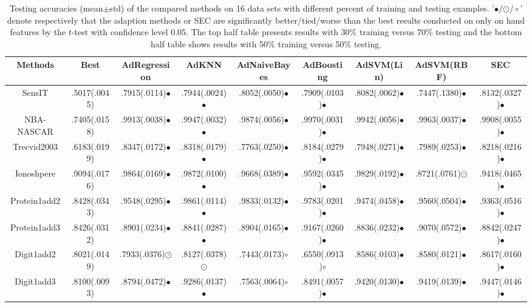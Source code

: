 \documentclass[10pt,journal,compsoc]{IEEEtran}
\begin{document}
\begin{table*}[!t]
\caption{Testing accuracies (mean$\pm$std) of the compared methods on 16 data sets with different percent of training and testing examples. '$\bullet/${\tiny $\odot$}$/\circ$' denote respectively that the adaption methods or SEC are significantly better/tied/worse than the best results conducted on only on hand features by the $t$-test\cite{t-test} with confidence level 0.05. The top half table presents results with 30\% training versus 70\% testing and the bottom half table shows results with 50\% training versus 50\% testing.}
\label{table_accuracy}
\centering
\vskip -0.1in
{
\begin{tabular}{c|| c c c c c c c c }
\hline
  Methods       &  Best   &  AdRegression   & AdKNN    & AdNaiveBayes    & AdBoosting &  AdSVM(Lin) & AdSVM(RBF) & SEC \\
\hline
SensIT          & .5017(.0045)& .7915(.0114)$\bullet$ & .7944(.0024)$\bullet$ & .8052(.0050)$\bullet$ & .7909(.0103)$\bullet$ & .8082(.0062)$\bullet$ & .7447(.1380)$\bullet$ & .8132(.0327)$\bullet$ \\
NBA-NASCAR      & .7405(.0158)& .9913(.0038)$\bullet$ & .9947(.0032)$\bullet$ & .9874(.0056)$\bullet$ & .9970(.0031)$\bullet$ & .9942(.0056)$\bullet$ & .9963(.0037)$\bullet$ & .9908(.0055)$\bullet$ \\
Trecvid2003     & .6183(.0199)& .8347(.0172)$\bullet$ & .8318(.0179)$\bullet$ & .7763(.0250)$\bullet$ & .8184(.0279)$\bullet$ & .7948(.0271)$\bullet$ & .7989(.0253)$\bullet$ & .8218(.0216)$\bullet$ \\
Ionoshpere      & .9094(.0176)& .9864(.0169)$\bullet$ & .9872(.0100)$\bullet$ & .9668(.0389)$\bullet$ & .9592(.0345)$\bullet$ & .9829(.0192)$\bullet$ & .8721(.0761){\tiny $\odot$} & .9418(.0465)$\bullet$ \\
Protein1add2    & .8428(.0343)& .9548(.0295)$\bullet$ & .9861(.0114)$\bullet$ & .9833(.0132)$\bullet$ & .9783(.0201)$\bullet$ & .9474(.0458)$\bullet$ & .9560(.0504)$\bullet$ & .9363(.0516)$\bullet$ \\
Protein1add3    & .8426(.0312)& .8901(.0234)$\bullet$ & .8841(.0287)$\bullet$ & .8904(.0165)$\bullet$ & .9167(.0260)$\bullet$ & .8836(.0232)$\bullet$ & .9070(.0572)$\bullet$ & .8842(.0247)$\bullet$ \\
Digit1add2      & .8021(.0149)& .7933(.0376){\tiny $\odot$} & .8127(.0378){\tiny $\odot$} & .7443(.0173)$\circ$ & .6550(.0913)$\circ$ & .8586(.0103)$\bullet$ & .8580(.0121)$\bullet$ & .8617(.0160)$\bullet$ \\
Digit1add3      & .8100(.0093)& .8794(.0472)$\bullet$ & .9286(.0137)$\bullet$ & .7563(.0064)$\circ$ & .8491(.0057)$\bullet$ & .9420(.0130)$\bullet$ & .9419(.0139)$\bullet$ & .9447(.0146)$\bullet$ \\

\end{tabular}}
\end{table*}
\end{document}
